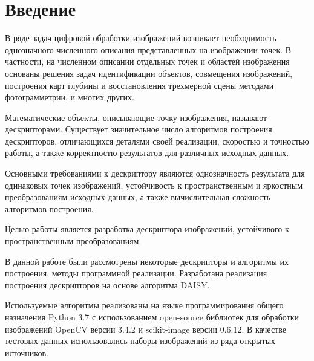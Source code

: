 \section*{Введение}
{	
	В ряде задач цифровой обработки изображений возникает необходимость однозначного численного описания представленных на изображении точек. В частности, на численном описании отдельных точек и областей изображения основаны решения задач идентификации объектов, совмещения изображений, построения карт глубины и восстановления трехмерной сцены методами фотограмметрии, и многих других.
	
	Математические объекты, описывающие точку изображения, называют дескрипторами. Существует значительное число алгоритмов построения дескрипторов, отличающихся деталями своей реализации, скоростью и точностью работы, а также корректностю результатов для различных исходных данных. 
	
	Основными требованиями к дескриптору являются однозначность результата для одинаковых точек изображений, устойчивость к пространственным и яркостным преобразованиям исходных данных, а также вычислительная сложность алгоритмов построения. 
	
	Целью работы является разработка дескриптора изображений, устойчивого к пространственным преобразованиям.
	
	В данной работе были рассмотрены некоторые дескрипторы и алгоритмы их построения, методы программной реализации. Разработана реализация построения дескрипторов на основе алгоритма DAISY.  
	
	Используемые алгоритмы реализованы на языке программирования общего назначения Python 3.7 с использованием open-source библиотек для обработки изображений OpenCV версии 3.4.2 и scikit-image версии 0.6.12. В качестве тестовых данных использовались наборы изображений из ряда открытых источников.
}

\newpage

